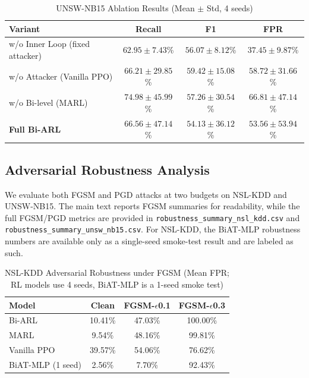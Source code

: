 \begin{table}[h]
    \centering
    \caption{UNSW-NB15 Ablation Results (Mean $\pm$ Std, 4 seeds)}
    \label{tab:ablation_unsw}
    \begin{tabular}{lccc}
        \toprule
        \textbf{Variant} & \textbf{Recall} & \textbf{F1} & \textbf{FPR} \\
        \midrule
        w/o Inner Loop (fixed attacker) & $62.95{\pm}7.43$\% & $56.07{\pm}8.12$\% & $\mathbf{37.45{\pm}9.87}$\% \\
        w/o Attacker (Vanilla PPO)      & $66.21{\pm}29.85$\% & $\mathbf{59.42{\pm}15.08}$\% & $58.72{\pm}31.66$\% \\
        w/o Bi-level (MARL)             & $\mathbf{74.98{\pm}45.99}$\% & $57.26{\pm}30.54$\% & $66.81{\pm}47.14$\% \\
        \midrule
        \textbf{Full Bi-ARL}            & $66.56{\pm}47.14$\% & $54.13{\pm}36.12$\% & $53.56{\pm}53.94$\% \\
        \bottomrule
    \end{tabular}
\end{table}

\subsection{Adversarial Robustness Analysis}
\label{sec:robustness}

We evaluate both FGSM \cite{goodfellow2015fgsm} and PGD \cite{madry2018pgd} attacks at two budgets on NSL-KDD and UNSW-NB15. The main text reports FGSM summaries for readability, while the full FGSM/PGD metrics are provided in \texttt{robustness\_summary\_nsl\_kdd.csv} and \texttt{robustness\_summary\_unsw\_nb15.csv}. For NSL-KDD, the BiAT-MLP robustness numbers are available only as a single-seed smoke-test result and are labeled as such.

\begin{table}[h]
    \centering
    \caption{NSL-KDD Adversarial Robustness under FGSM (Mean FPR; RL models use 4 seeds, BiAT-MLP is a 1-seed smoke test)}
    \label{tab:adversarial_nsl}
    \begin{tabular}{lccc}
        \toprule
        \textbf{Model} & \textbf{Clean} & \textbf{FGSM-$\epsilon$0.1} & \textbf{FGSM-$\epsilon$0.3} \\
        \midrule
        Bi-ARL            & 10.41\%  & 47.03\% & 100.00\% \\
        MARL              & 9.54\%   & 48.16\% & 99.81\% \\
        Vanilla PPO       & 39.57\%  & 54.06\% & 76.62\% \\
        BiAT-MLP (1 seed) & 2.56\%   & 7.70\%  & 92.43\% \\
        \bottomrule
    \end{tabular}
\end{table}

